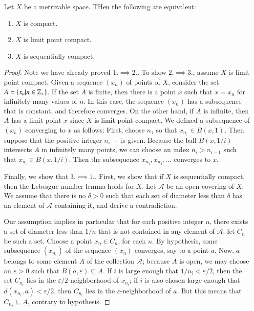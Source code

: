 \documentclass[12pt, a4paper, oneside, openright, titlepage]{book}
\begin{document}
\begin{theorem}
    Let $X$ be a metrizable space. THen the following are equivalent: \begin{enumerate}
        \item $X$ is compact.
        \item $X$ is limit point compact.
        \item $X$ is sequentially compact.
    \end{enumerate}
\end{theorem}
\begin{proof}
    Note we have already proved $1.\implies 2.$. To show $2.\implies 3.$, assume $X$ is limit point compact. Given a sequence $(x_n)$ of points of $X$, consider the set $A = \{x_n\vert n \in \mathbb Z_+\}$. If the set $A$ is finite, then there is a point $x$ such that $x = x_n$ for infinitely many values of $n$. In this case, the sequence $(x_n)$ has a subsequence that is constant, and therefore converges. On the other hand, if $A$ is infinite, then $A$ has a limit point $x$ since $X$ is limit point compact. We defined a subsequence of $(x_n)$ converging to $x$ as follows: First, choose $n_1$ so that $x_{n_1} \in B(x,1)$. Then suppose that the positive integer $n_{i-1}$ is given. Because the ball $B(x,1/i)$ intersects $A$ in infinitely many points, we can choose an index $n_i > n_{i-1}$ such that $x_{n_i} \in B(x,1/i)$. Then the subsequence $x_{n_1},x_{n_2},...$ converges to $x$.


    Finally, we show that $3.\implies 1.$. First, we show that if $X$ is sequentially compact, then the Lebesgue number lemma holds for $X$. Let $\mathcal{A}$ be an open covering of $X$. We assume that there is no $\delta > 0$ such that each set of diameter less than $\delta$ has an element of $\mathcal{A}$ containing it, and derive a contradiction.


    Our assumption implies in particular that for each positive integer $n$, there exists a set of diameter less than $1/n$ that is not contained in any element of $\mathcal{A}$; let $C_n$ be such a set. Choose a point $x_n \in C_n$, for each $n$. By hypothesis, some subsequence $(x_{n_i})$ of the sequence $(x_n)$ converges, say to a point $a$. Now, $a$ belongs to some element $A$ of the collection $\mathcal{A}$; because $A$ is open, we may choose an $\varepsilon > 0$ such that $B(a,\varepsilon) \subseteq A$. If $i$ is large enough that $1/n_i < \varepsilon/2$, then the set $C_{n_i}$ lies in the $\varepsilon/2$-neighborhood of $x_{n_i}$; if $i$ is also chosen large enough that $d(x_{n_i},a) < \varepsilon/2$, then $C_{n_i}$ lies in the $\varepsilon$-neighborhood of $a$. But this means that $C_{n_i} \subseteq A$, contrary to hypothesis. 



\end{proof}
\end{document}
